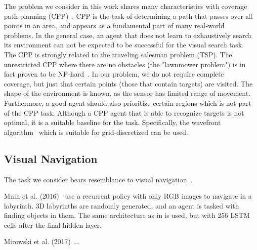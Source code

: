 
The problem we consider in this work shares many characteristics with coverage path planning (CPP)~\cite{galceran_carreras_2013}.
CPP is the task of determining a path that passes over all points in an area, and appears as a fundamental part of many real-world problems. 
In the general case, an agent that does not learn to exhaustively search its environment can not be expected to be successful for the visual search task.
The CPP is strongly related to the traveling salesman problem (TSP).
The unrestricted CPP where there are no obstacles (the "lawnmower problem") is in fact proven to be NP-hard~\cite{arkin_lawnmowing_2000}.
In our problem, we do not require complete coverage, but just that certain points (those that contain targets) are visited.
The shape of the environment is known, as the sensor has limited range of movement.
Furthermore, a good agent should also prioritize certain regions which is not part of the CPP task.
Although a CPP agent that is able to recognize targets is not optimal, it is a suitable baseline for the task.
Specifically, the wavefront algorithm~\cite{galceran_carreras_2013} which is suitable for grid-discretized can be used. %


\subsection{Visual Navigation}

The task we consider bears resemblance to visual navigation~\cite{zeng_survey_2020}. %





Mnih et al. (2016)~\cite{mnih_asynchronous_2016} use a recurrent policy with only RGB images to navigate in a labyrinth.
3D labyrinths are randomly generated, and an agent is tasked with finding objects in them.
The same architecture as in \cite{mnih_human_2015} is used, but with 256 LSTM cells after the final hidden layer.



Mirowski et al. (2017)~\cite{mirowski_navigate_2017}...

